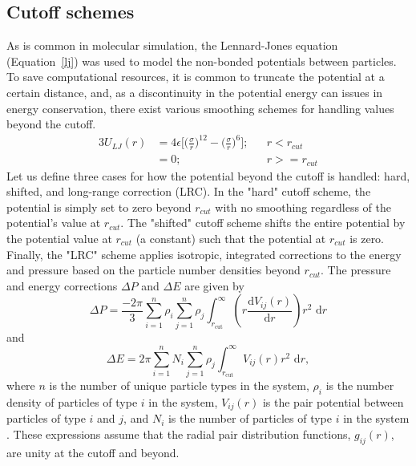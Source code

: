 \subsection{Cutoff schemes}\label{sec:cutoff}

As is common in molecular simulation, the Lennard-Jones equation (Equation~\eqref{lj}) was used to model the non-bonded potentials between particles.
To save computational resources, it is common to truncate the potential at a certain distance, and, as a discontinuity in the potential energy can issues in energy conservation, there exist various smoothing schemes for handling values beyond the cutoff.
\begin{alignat}{3}
U_{LJ}(r) & = 4\epsilon\bigg[\bigg(\frac{\sigma}{r}\bigg)^{12} - \bigg(\frac{\sigma}{r}\bigg)^{6}\bigg]; && r<r_{cut} 
    \label{lj} \\
& = 0; && r>=r_{cut}
    \nonumber
\end{alignat}
Let us define three cases for how the potential beyond the cutoff is handled: hard, shifted, and long-range correction (LRC). 
In the "hard" cutoff scheme, the potential is simply set to zero beyond $r_{cut}$ with no smoothing regardless of the potential’s value at $r_{cut}$.
The "shifted" cutoff scheme shifts the entire potential by the potential value at $r_{cut}$ (a constant) such that the potential at $r_{cut}$ is zero.
Finally, the "LRC" scheme applies isotropic, integrated corrections to the energy and pressure based on the particle number densities beyond $r_{cut}$.
The pressure and energy corrections $\Delta P$ and $\Delta E$ are given by
\begin{equation}\label{lrc_p}
    \Delta P = \frac{-2\pi}{3} \sum_{i=1}^{n} \rho_i \sum_{j=1}^{n} \rho_j
    \int_{r_\mathrm{cut}}^{\infty} \left( r
    \frac{\mathrm{d}V_{ij}(r)}{\mathrm{d}r} \right) r^2 \,\,\mathrm{d}r  
\end{equation}
and
\begin{equation}\label{lrc_e}
    \Delta E = 2\pi \sum_{i=1}^{n} N_i \sum_{j=1}^{n} \rho_j
    \int_{r_\mathrm{cut}}^{\infty} V_{ij}(r) r^2\,\,\mathrm{d}r, 
\end{equation}
where $n$ is the number of unique particle types in the system, $\rho_{i}$ is the number density of particles of type $i$ in the system, $V_{ij}(r)$ is the pair potential between particles of type $i$ and $j$, and $N_{i}$ is the number of particles of type $i$ in the system \citep{frenkel2001understanding, Sun1998}.
These expressions assume that the radial pair distribution functions, $g_{ij}(r)$, are unity at the cutoff and beyond. 

